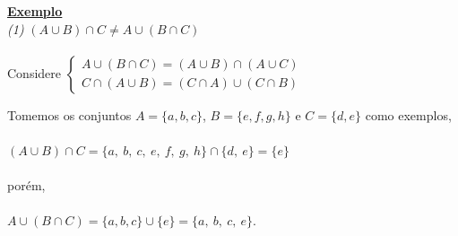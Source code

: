 \noindent
\textbf{\underline{Exemplo}} \\

\noindent
\emph{(1)} $ (A \cup B ) \cap C \ne A \cup ( B \cap C ) $ \\ \\
Considere
$\begin{cases}
 A \cup ( B \cap C ) = ( A \cup B ) \cap ( A \cup C ) \\
 C \cap ( A \cup B ) = (C \cap A ) \cup ( C \cap B )
\end{cases}$  

Tomemos os conjuntos $ A = \{ a,b,c \} $,  $ B = \{ e, f, g, h \} $ e $ C = \{ d, e \} $ como exemplos, \\ \\
$ ( A \cup B ) \cap C = \{ a, \ b, \ c, \ e, \ f, \ g, \ h \} \cap \{ d, \ e \} = \{ e \} $ \\ \\
porém, \\ \\
$ A \cup ( B \cap C ) = \{ a, b, c \} \cup \{ e \} = \{a, \ b, \ c, \ e \}$. \\

